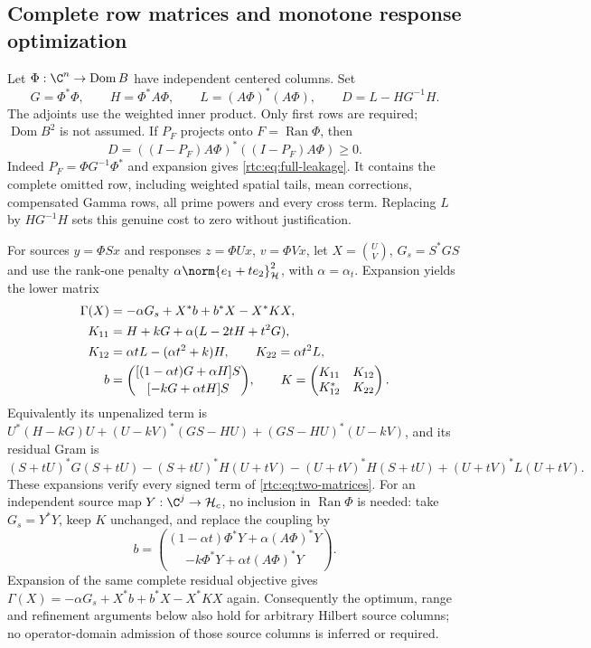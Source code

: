 \documentclass[11pt,a4paper]{article}
\numberwithin{equation}{section}
\theoremstyle{definition}\newtheorem{definition}[theorem]{Definition}
\theoremstyle{remark}\newtheorem{remark}[theorem]{Remark}
\newcommand{\Hh}{\mathcal H}\newcommand{\Hw}{\mathcal H}
\begin{document}
\subsection{Complete row matrices and monotone response optimization}\label{rtc:sec:optimization}
Let $\Phi:\C^n\to\operatorname{Dom}B$ have independent centered columns.
Set
\begin{equation}\label{rtc:eq:full-grams}
 G=\Phi^*\Phi,\qquad H=\Phi^*A\Phi,\qquad
 L=(A\Phi)^*(A\Phi),\qquad
 D=L-HG^{-1}H.
\end{equation}
The adjoints use the weighted inner product. Only first rows are required;
$\operatorname{Dom}B^2$ is not assumed. If $P_F$ projects onto
$F=\operatorname{Ran}\Phi$, then
\begin{equation}\label{rtc:eq:full-leakage}
 D=((I-P_F)A\Phi)^*((I-P_F)A\Phi)\ge0.
\end{equation}
Indeed $P_F=\Phi G^{-1}\Phi^*$ and expansion gives
\eqref{rtc:eq:full-leakage}. It contains the complete omitted row,
including weighted spatial tails, mean corrections, compensated Gamma rows,
all prime powers and every cross term. Replacing $L$ by $HG^{-1}H$
sets this genuine cost to zero without justification.

For sources $y=\Phi Sx$ and responses $z=\Phi Ux$, $v=\Phi Vx$, let
$X=\binom UV$, $G_s=S^*GS$ and use the rank-one penalty
$\alpha\norm{e_1+te_2}_{\Hh}^2$, with $\alpha=\alpha_t$.
Expansion yields the lower matrix
\begin{align}\label{rtc:eq:two-matrices}
 \Gamma(X)&=-\alpha G_s+X^*b+b^*X-X^*KX,\notag\\
 K_{11}&=H+kG+\alpha(L-2tH+t^2G),\notag\\
 K_{12}&=\alpha tL-(\alpha t^2+k)H,\qquad K_{22}=\alpha t^2L,\\
 b&=\binom{[(1-\alpha t)G+\alpha H]S}{[-kG+\alpha tH]S},\qquad
 K=\begin{pmatrix}K_{11}&K_{12}\\K_{12}^*&K_{22}\end{pmatrix}.\notag
\end{align}
Equivalently its unpenalized term is
$U^*(H-kG)U+(U-kV)^*(GS-HU)+(GS-HU)^*(U-kV)$, and its residual Gram is
\[
 (S+tU)^*G(S+tU)-(S+tU)^*H(U+tV)
 -(U+tV)^*H(S+tU)+(U+tV)^*L(U+tV).
\]
These expansions verify every signed term of \eqref{rtc:eq:two-matrices}.
For an independent source map $Y:\C^j\to\Hh_c$, no inclusion in
$\operatorname{Ran}\Phi$ is needed: take $G_s=Y^*Y$, keep $K$ unchanged,
and replace the coupling by
\begin{equation}\label{rtc:eq:two-rectangular}
 b=\binom{(1-\alpha t)\Phi^*Y+\alpha(A\Phi)^*Y}
              {-k\Phi^*Y+\alpha t(A\Phi)^*Y}.
\end{equation}
Expansion of the same complete residual objective gives
$\Gamma(X)=-\alpha G_s+X^*b+b^*X-X^*KX$ again.
Consequently the optimum, range and refinement arguments below also hold
for arbitrary Hilbert source columns; no operator-domain admission of those
source columns is inferred or required.
\end{document}
